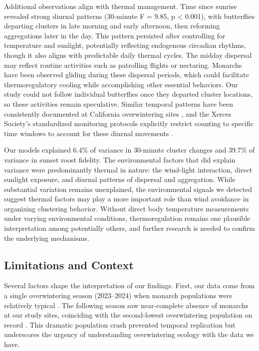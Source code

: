 Additional observations align with thermal management. Time since sunrise revealed strong diurnal patterns (30-minute F = 9.85, p < 0.001), with butterflies departing clusters in late morning and early afternoon, then reforming aggregations later in the day. This pattern persisted after controlling for temperature and sunlight, potentially reflecting endogenous circadian rhythms, though it also aligns with predictable daily thermal cycles. The midday dispersal may reflect routine activities such as patrolling flights or nectaring. Monarchs have been observed gliding during these dispersal periods, which could facilitate thermoregulatory cooling while accomplishing other essential behaviors. Our study could not follow individual butterflies once they departed cluster locations, so these activities remain speculative. Similar temporal patterns have been consistently documented at California overwintering sites \parencite{tuskesOverwinteringEcologyMonarch1978,chaplinEnergyReservesMetabolic1982}, and the Xerces Society's standardized monitoring protocols explicitly restrict counting to specific time windows to account for these diurnal movements \parencite{xercessocietyStepbyStepWesternMonarch2017}.

Our models explained 6.4\% of variance in 30-minute cluster changes and 39.7\% of variance in sunset roost fidelity. The environmental factors that did explain variance were predominantly thermal in nature: the wind-light interaction, direct sunlight exposure, and diurnal patterns of dispersal and aggregation. While substantial variation remains unexplained, the environmental signals we detected suggest thermal factors may play a more important role than wind avoidance in organizing clustering behavior. Without direct body temperature measurements under varying environmental conditions, thermoregulation remains one plausible interpretation among potentially others, and further research is needed to confirm the underlying mechanisms.

\subsection{Limitations and Context}

Several factors shape the interpretation of our findings. First, our data come from a single overwintering season (2023--2024) when monarch populations were relatively typical \parencite{xercessocietyWesternMonarchThanksgiving2025}. The following season saw near-complete absence of monarchs at our study sites, coinciding with the second-lowest overwintering population on record \parencite{xercessocietyWesternMonarchButterfly2025}. This dramatic population crash prevented temporal replication but underscores the urgency of understanding overwintering ecology with the data we have.

